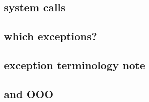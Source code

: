 \subsection{system calls}








\subsection{which exceptions?}


\subsection{exception terminology note}



\subsection{and OOO}


